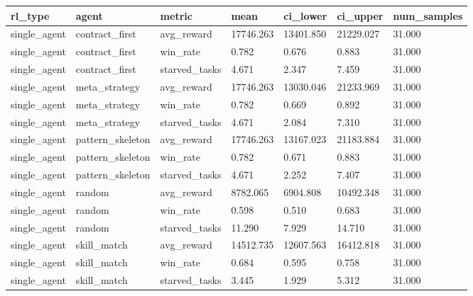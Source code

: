 \begin{tabular}{lllllll}
\toprule
rl\_type & agent & metric & mean & ci\_lower & ci\_upper & num\_samples \\
\midrule
single\_agent & contract\_first & avg\_reward & 17746.263 & 13401.850 & 21229.027 & 31.000 \\
single\_agent & contract\_first & win\_rate & 0.782 & 0.676 & 0.883 & 31.000 \\
single\_agent & contract\_first & starved\_tasks & 4.671 & 2.347 & 7.459 & 31.000 \\
single\_agent & meta\_strategy & avg\_reward & 17746.263 & 13030.046 & 21233.969 & 31.000 \\
single\_agent & meta\_strategy & win\_rate & 0.782 & 0.669 & 0.892 & 31.000 \\
single\_agent & meta\_strategy & starved\_tasks & 4.671 & 2.084 & 7.310 & 31.000 \\
single\_agent & pattern\_skeleton & avg\_reward & 17746.263 & 13167.023 & 21183.884 & 31.000 \\
single\_agent & pattern\_skeleton & win\_rate & 0.782 & 0.671 & 0.883 & 31.000 \\
single\_agent & pattern\_skeleton & starved\_tasks & 4.671 & 2.252 & 7.407 & 31.000 \\
single\_agent & random & avg\_reward & 8782.065 & 6904.808 & 10492.348 & 31.000 \\
single\_agent & random & win\_rate & 0.598 & 0.510 & 0.683 & 31.000 \\
single\_agent & random & starved\_tasks & 11.290 & 7.929 & 14.710 & 31.000 \\
single\_agent & skill\_match & avg\_reward & 14512.735 & 12607.563 & 16412.818 & 31.000 \\
single\_agent & skill\_match & win\_rate & 0.684 & 0.595 & 0.758 & 31.000 \\
single\_agent & skill\_match & starved\_tasks & 3.445 & 1.929 & 5.312 & 31.000 \\
\bottomrule
\end{tabular}
